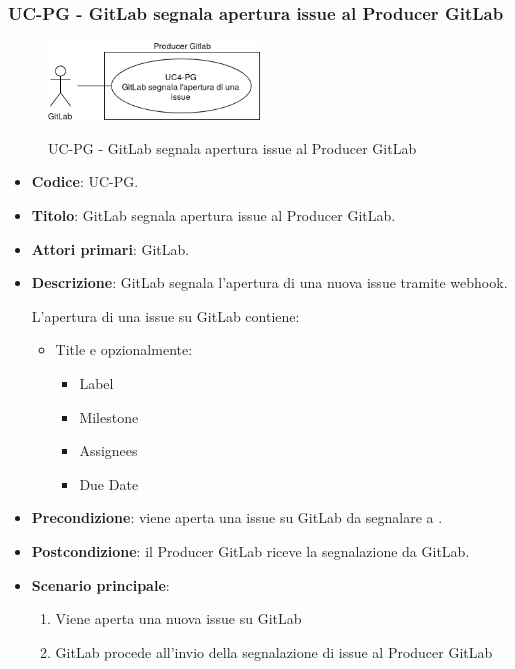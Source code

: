 \subsubsection{UC\theuccount-PG - GitLab segnala apertura issue al Producer GitLab}
	\begin{figure}[H]
		\centering
		\includegraphics[width=0.5\textwidth]{img/casi_d'uso/UC4.png}\\
		\caption{UC\theuccount-PG - GitLab segnala apertura issue al Producer GitLab}
	\end{figure}
	\begin{itemize}
		\item \textbf{Codice}: UC\theuccount-PG.
		\item \textbf{Titolo}: GitLab segnala apertura issue al Producer GitLab.
		\item \textbf{Attori primari}: GitLab.
		\item \textbf{Descrizione}: GitLab segnala l'apertura di una nuova issue tramite webhook.
		
		L'apertura di una issue su GitLab contiene:
		\begin{itemize}
			\item Title e opzionalmente:
			\begin{itemize}
				\item Label
				\item Milestone
				\item Assignees
				\item Due Date
			\end{itemize}
		\end{itemize}
		\item \textbf{Precondizione}: viene aperta una issue su GitLab da 
		segnalare a \progetto.
		\item \textbf{Postcondizione}: il Producer GitLab riceve la segnalazione da GitLab.
		\item \textbf{Scenario principale}: 
		\begin{enumerate}
			\item Viene aperta una nuova issue su GitLab
			\item GitLab procede all'invio della segnalazione di issue al Producer GitLab
		\end{enumerate}
		
	\end{itemize}